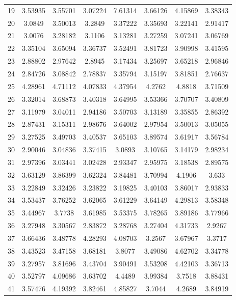 \begin{center}
\begin{longtable}{cccccccc}
19 & 3.53935 & 3.55701 & 3.07224 & 7.61314 & 3.66126 & 4.15869 & 3.38343\\
20 & 3.0849 & 3.50013 & 3.2849 & 3.37222 & 3.35693 & 3.22141 & 2.91417\\
21 & 3.0076 & 3.28182 & 3.1106 & 3.13281 & 3.27259 & 3.07241 & 3.06769\\
22 & 3.35104 & 3.65094 & 3.36737 & 3.52491 & 3.81723 & 3.90998 & 3.41595\\
23 & 2.88802 & 2.97642 & 2.8945 & 3.17434 & 3.25697 & 3.65218 & 2.96846\\
24 & 2.84726 & 3.08842 & 2.78837 & 3.35794 & 3.15197 & 3.81851 & 2.76637\\
25 & 4.28961 & 4.71112 & 4.07833 & 4.37954 & 4.2762 & 4.8818 & 3.71509\\
26 & 3.32014 & 3.68873 & 3.40318 & 3.64995 & 3.53366 & 3.70707 & 3.40809\\
27 & 3.11979 & 3.04011 & 2.94186 & 3.50703 & 3.13189 & 3.35855 & 2.86392\\
28 & 2.87431 & 3.15311 & 2.98676 & 3.64002 & 2.97954 & 3.50013 & 3.05055\\
29 & 3.27525 & 3.49703 & 3.40537 & 3.65103 & 3.89574 & 3.61917 & 3.56784\\
30 & 2.90046 & 3.04836 & 3.37415 & 3.0893 & 3.10765 & 3.14179 & 2.98234\\
31 & 2.97396 & 3.03441 & 3.02428 & 2.93347 & 2.95975 & 3.18538 & 2.89575\\
32 & 3.63129 & 3.86399 & 3.62324 & 3.84481 & 3.70994 & 4.1906 & 3.633\\
33 & 3.22849 & 3.32426 & 3.23822 & 3.19825 & 3.40103 & 3.86017 & 2.93833\\
34 & 3.53437 & 3.76252 & 3.62065 & 3.61229 & 3.64149 & 4.29813 & 3.58348\\
35 & 3.44967 & 3.7738 & 3.61985 & 3.53375 & 3.78265 & 3.89186 & 3.77966\\
36 & 3.27948 & 3.30567 & 2.83872 & 3.28768 & 3.27404 & 4.31733 & 2.9267\\
37 & 3.66436 & 3.48778 & 4.28293 & 4.08703 & 3.2567 & 3.67967 & 3.3717\\
38 & 3.43523 & 3.47158 & 3.68181 & 3.8077 & 3.49086 & 4.62702 & 3.34778\\
39 & 3.27957 & 3.81696 & 3.43704 & 3.90491 & 3.53208 & 4.42103 & 3.36713\\
40 & 3.52797 & 4.09686 & 3.63702 & 4.4489 & 3.99384 & 3.7518 & 3.88431\\
41 & 3.57476 & 4.19392 & 3.82461 & 4.85827 & 3.7044 & 4.2689 & 3.84919\\

\end{longtable}
\end{center}
